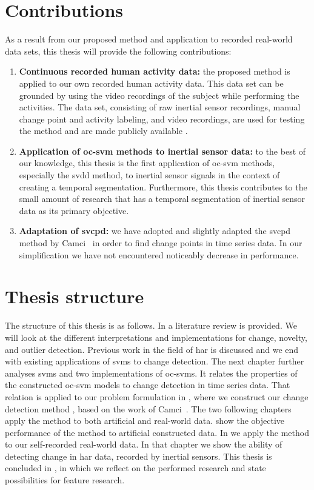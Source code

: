 \section{Contributions}
As a result from our proposed method and application to recorded real-world data sets, this thesis will provide the following contributions:
\begin{enumerate}
  \item \textbf{Continuous recorded human activity data:} the proposed method is applied to our own recorded human activity data.
  This data set can be grounded by using the video recordings of the subject while performing the activities.
  The data set, consisting of raw inertial sensor recordings, manual change point and activity labeling, and video recordings, are used for testing the method and are made publicly available \cite{vlasveld2013continuous}.
  \item \textbf{Application of \gls{oc-svm} methods to inertial sensor data:} to the best of our knowledge, this thesis is the first application of \gls{oc-svm} methods, especially the \gls{svdd} method, to inertial sensor signals in the context of creating a temporal segmentation.
  Furthermore, this thesis contributes to the small amount of research that has a temporal segmentation of inertial sensor data as its primary objective.
  \item \textbf{Adaptation of \acrshort{svcpd}:} we have adopted and slightly adapted the \acrshort{svcpd} method by Camci~\cite{camci2010change} in order to find change points in time series data.
  In our simplification we have not encountered noticeably decrease in performance.
\end{enumerate}

\section{Thesis structure}
The structure of this thesis is as follows.
In  a literature review is provided.
We will look at the different interpretations and implementations for change, novelty, and outlier detection.
Previous work in the field of \gls{har} is discussed and we end with existing applications of \glspl{svm} to change detection.
The next chapter further analyses \glspl{svm} and two implementations of \glspl{oc-svm}.
It relates the properties of the constructed \gls{oc-svm} models to change detection in time series data.
That relation is applied to our problem formulation in , where we construct our change detection method , based on the work of Camci~\cite{camci2010change}.
The two following chapters apply the method to both artificial and real-world data.
 show the objective performance of the method to artificial constructed data.
In  we apply the method to our self-recorded real-world data.
In that chapter we show the ability of detecting change in \gls{har} data, recorded by inertial sensors.
This thesis is concluded in , in which we reflect on the performed research and state possibilities for feature research.